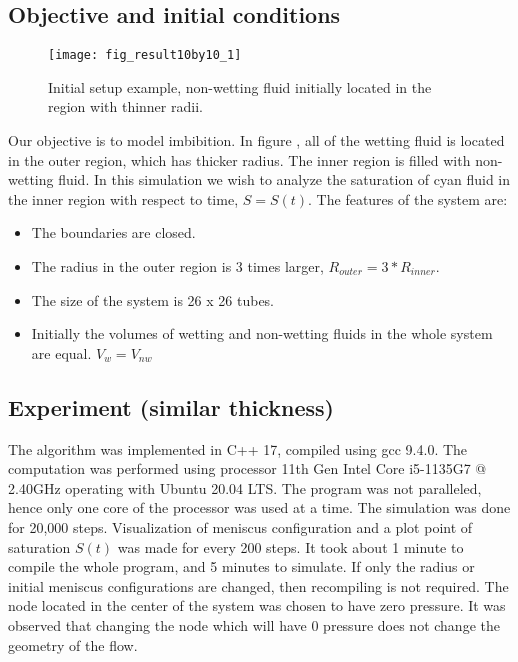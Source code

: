 \subsection{Objective and initial conditions} \label{sec:exp-init}
	\begin{figure}[H]
		\centering
		\texttt{[image: fig\_result10by10\_1]}
		\caption{Initial setup example, non-wetting fluid initially located in the region with thinner radii.}
		\label{fig:invasion-result1}
	\end{figure}	
	
	Our objective is to model imbibition. In figure \label{fig:invasion-result1}, all of the wetting fluid is located in the outer region, which has thicker radius. The inner region is filled with non-wetting fluid. In this simulation we wish to analyze the saturation of cyan fluid in the inner region with respect to time, $S = S(t)$. The features of the system are:
	
	\begin{itemize}
		\item The boundaries are closed.
		\item The radius in the outer region is 3 times larger, $R_{outer} = 3 * R_{inner}$.
		\item The size of the system is 26 x 26 tubes.
		\item Initially the volumes of wetting and non-wetting fluids in the whole system are equal. $V_{w} = V_{nw}$
	\end{itemize}
	
\subsection{Experiment (similar thickness)} \label{sec:exp-main}
	The algorithm was implemented in C++ 17, compiled using gcc 9.4.0. The computation was performed using processor 11th Gen Intel Core i5-1135G7 @ 2.40GHz operating with Ubuntu 20.04 LTS. The program was not paralleled, hence only one core of the processor was used at a time. The simulation was done for 20,000 steps. Visualization of meniscus configuration and a plot point of saturation $S(t)$ was made for every 200 steps. It took about 1 minute to compile the whole program, and 5 minutes to simulate. If only the radius or initial meniscus configurations are changed, then recompiling is not required. The node located in the center of the system was chosen to have zero pressure. It was observed that changing the node which will have 0 pressure does not change the geometry of the flow.
	
